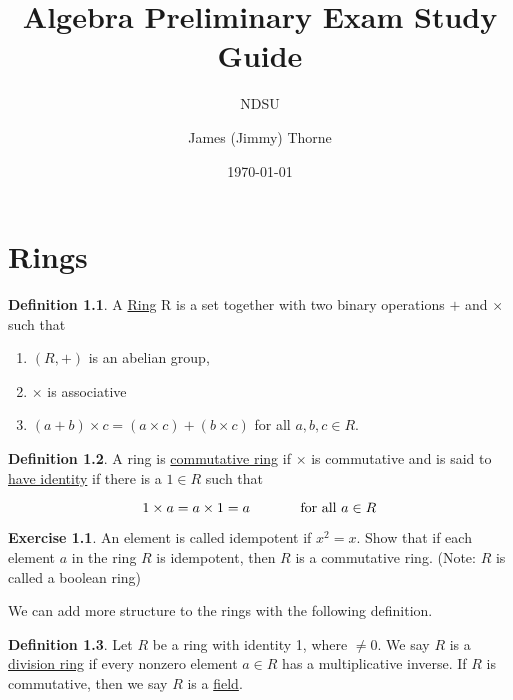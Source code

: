 \documentclass[12pt]{book}
\title{Algebra Preliminary Exam Study Guide}
\subtitle{NDSU}
\author{James (Jimmy) Thorne}
\date{\today}
\theoremstyle{definition}
\newtheorem{define}{Definition}
\newtheorem{ex}{Exercise}
\begin{document}
	
	\maketitle
	
	\chapter{Rings}
	
	\begin{define}
		A \underline{Ring} R is a set together with two binary operations $+$ and $\times$
		such that
		\begin{enumerate}
			\item $(R,+)$ is an abelian group,
			\item $\times$ is associative
			\item $(a+b)\times c = (a\times c) + (b\times c)$ for all $a,b,c\in R$.	
		\end{enumerate}
	\end{define}

	\begin{define}
		A ring is \underline{commutative ring} if $\times$ is commutative and is said to 
		\underline{have identity} if there is a $1\in R$ such that 
		
		$$ 1\times a = a \times 1 =a \hspace{0.5in} \mbox{for all } a\in R$$
	\end{define}
	
	\begin{ex}
		An element is called idempotent if $x^2=x$.  Show that if each element $a$
		in the ring $R$
		is idempotent, then $R$ is a commutative ring.  (Note: $R$ is called a
		boolean ring)
	\end{ex}

	We can add more structure to the rings with the following definition.
	
	\begin{define}
		Let $R$ be a ring with identity 1, where $\neq 0$.  We say $R$ is a 
		\underline{division ring} if every nonzero element $a\in R$ has a
		multiplicative inverse.  If $R$ is commutative, then we say $R$ is a 
		\underline{field}.
	\end{define}

	
\end{document}
